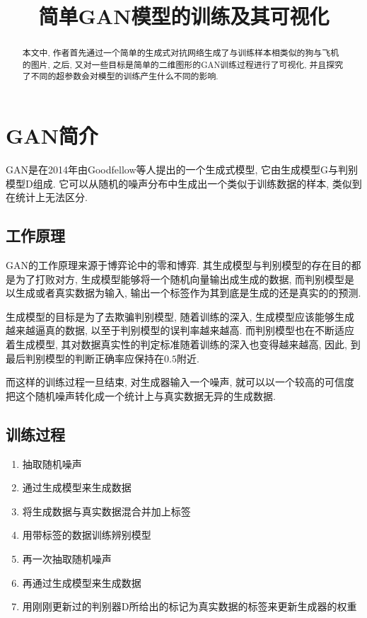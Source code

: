 \documentclass[lang=cn,11pt]{elegantpaper}
\title{简单GAN模型的训练及其可视化}
\date{}
\begin{document}

\newpage
\maketitle
{}

\begin{abstract}
本文中, 作者首先通过一个简单的生成式对抗网络生成了与训练样本相类似的狗与飞机的图片, 之后, 又对一些目标是简单的二维图形的GAN训练过程进行了可视化, 并且探究了不同的超参数会对模型的训练产生什么不同的影响. 
\end{abstract}
\tableofcontents
\newpage
{}
\section{GAN简介}

GAN是在2014年由Goodfellow等人提出的一个生成式模型, 它由生成模型G与判别模型D组成. 它可以从随机的噪声分布中生成出一个类似于训练数据的样本, 类似到在统计上无法区分. 

\subsection{工作原理}

GAN的工作原理来源于博弈论中的零和博弈. 其生成模型与判别模型的存在目的都是为了打败对方, 生成模型能够将一个随机向量输出成生成的数据, 而判别模型是以生成或者真实数据为输入, 输出一个标签作为其到底是生成的还是真实的的预测.

生成模型的目标是为了去欺骗判别模型, 随着训练的深入, 生成模型应该能够生成越来越逼真的数据, 以至于判别模型的误判率越来越高. 而判别模型也在不断适应着生成模型, 其对数据真实性的判定标准随着训练的深入也变得越来越高, 因此, 到最后判别模型的判断正确率应保持在$0.5$附近. 

而这样的训练过程一旦结束, 对生成器输入一个噪声, 就可以以一个较高的可信度把这个随机噪声转化成一个统计上与真实数据无异的生成数据. 

\subsection{训练过程}
\begin{enumerate}

  \item 抽取随机噪声
  \item 通过生成模型来生成数据
  \item 将生成数据与真实数据混合并加上标签
  \item 用带标签的数据训练辨别模型
  \item 再一次抽取随机噪声
  \item 再通过生成模型来生成数据
  \item 用刚刚更新过的判别器D所给出的标记为真实数据的标签来更新生成器的权重
\end{enumerate}
\end{document}
